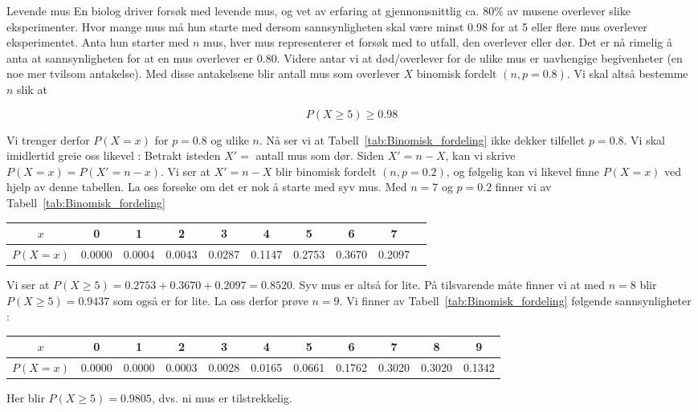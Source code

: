 \begin{eksempel}{Levende mus}
En biolog driver forsøk med levende mus, og vet av erfaring at
gjennomsnittlig ca. 80\% av musene overlever slike eksperimenter.
Hvor mange mus må hun starte med dersom sannsynligheten skal være
minst 0.98 for at 5 eller flere mus overlever eksperimentet. Anta hun starter
med $n$ mus, hver mus representerer et forsøk med
to utfall, den overlever eller dør. Det er nå rimelig å anta at
sannsynligheten for at en mus overlever er 0.80. Videre antar vi
at død/overlever for de ulike mus er uavhengige begivenheter (en
noe mer tvilsom antakelse). Med disse antakelsene blir 
antall mus som overlever $X$ binomisk fordelt $(n,p=0.8)$. Vi skal
altså bestemme $n$ slik at

\[ P(X\geq 5)\geq 0.98 \]

\noindent Vi trenger derfor $P(X=x)$ for $p=0.8$ og ulike $n$. Nå ser vi at
Tabell~\ref{tab:Binomisk_fordeling} ikke dekker tilfellet $p=0.8$. Vi skal imidlertid greie
oss likevel : Betrakt isteden $X'=$ antall mus som dør. Siden
$X'=n-X$, kan vi skrive\\ $P(X=x)=P(X'=n-x)$. Vi ser at $X'=n-X$
blir binomisk fordelt $(n, p=0.2)$, og følgelig kan vi likevel
finne $P(X=x)$ ved hjelp av denne tabellen. La oss forsøke om det
er nok å starte med syv mus. Med $n=7$ og $p=0.2$ finner vi av
Tabell~\ref{tab:Binomisk_fordeling}

\begin{center}  \small \addtolength{\tabcolsep}{-0.4\tabcolsep}
\begin{tabular}{c|ccccccccc}
   $x$  &  0   &   1  &  2   &   3  &   4  &  5   &  6   & 7 \\ \hline
$P(X=x)$&0.0000&0.0004&0.0043&0.0287&0.1147&0.2753&0.3670&0.2097
\end{tabular}
\end{center}

\noindent Vi ser at $P(X\geq 5)=0.2753+0.3670+0.2097=0.8520$. Syv mus er
altså for lite. På tilsvarende måte finner vi at med $n=8$ blir
$P(X\geq 5)=0.9437$ som også er for lite. La oss derfor prøve
$n=9$. Vi finner av Tabell~\ref{tab:Binomisk_fordeling} følgende sannsynligheter :

\begin{center}\scriptsize \addtolength{\tabcolsep}{-0.5\tabcolsep}
\begin{tabular}{c|cccccccccc}
   $x$  &  0   &   1  &  2   &   3  &   4  &  5   &  6   & 7 & 8 & 9\\ \hline
$P(X=x)$&0.0000&0.0000&0.0003&0.0028&0.0165&0.0661&0.1762&0.3020&0.3020&0.1342
\end{tabular}
\end{center}

\noindent Her blir $P(X\geq 5)=0.9805$, dvs. ni mus er tilstrekkelig.
\end{eksempel}

